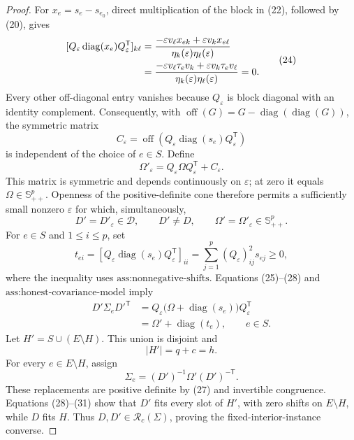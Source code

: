 \documentclass{article}
\begin{document}
\begin{proof}
For \(x_e=s_e-s_{e_0}\), direct multiplication of the block in (22), followed by (20), gives
\[
 \begin{aligned}
 \relax[Q_\varepsilon\operatorname{diag}(x_e)Q_\varepsilon^{\mathsf T}]_{k\ell}
 &=\frac{-\varepsilon v_\ell x_{ek}+\varepsilon v_kx_{e\ell}}
 {\eta_k(\varepsilon)\eta_\ell(\varepsilon)}\\
 &=\frac{-\varepsilon v_\ell\tau_ev_k+\varepsilon v_k\tau_ev_\ell}
 {\eta_k(\varepsilon)\eta_\ell(\varepsilon)}=0.
 \end{aligned}
 \tag{24}
\]
Every other off-diagonal entry vanishes because \(Q_\varepsilon\) is block diagonal with an identity complement.  Consequently, with \(\operatorname{off}(G)=G-\operatorname{diag}(\operatorname{diag}(G))\), the symmetric matrix
\[
 C_\varepsilon
 =\operatorname{off}\!\left(Q_\varepsilon
 \operatorname{diag}(s_e)Q_\varepsilon^{\mathsf T}\right)
 \tag{25}
\]
is independent of the choice of \(e\in S\).  Define
\[
 \Omega'_\varepsilon
 =Q_\varepsilon\Omega Q_\varepsilon^{\mathsf T}+C_\varepsilon.
 \tag{26}
\]
This matrix is symmetric and depends continuously on \(\varepsilon\); at zero it equals \(\Omega\in\mathbb S_{++}^p\).  Openness of the positive-definite cone therefore permits a sufficiently small nonzero \(\varepsilon\) for which, simultaneously,
\[
 D'=D'_{\varepsilon}\in\mathcal D,
 \qquad D'\ne D,
 \qquad \Omega'=\Omega'_\varepsilon\in\mathbb S_{++}^p.
 \tag{27}
\]
For \(e\in S\) and \(1\le i\le p\), set
\[
 t_{ei}
 =[Q_\varepsilon\operatorname{diag}(s_e)Q_\varepsilon^{\mathsf T}]_{ii}
 =\sum_{j=1}^p(Q_\varepsilon)_{ij}^2s_{ej}\ge0,
 \tag{28}
\]
where the inequality uses \(\text{ass:nonnegative-shifts}\).  Equations (25)--(28) and \(\text{ass:honest-covariance-model}\) imply
\[
 \begin{aligned}
 D'\Sigma_eD'^{\mathsf T}
 &=Q_\varepsilon\bigl(\Omega+\operatorname{diag}(s_e)\bigr)Q_\varepsilon^{\mathsf T}\\
 &=\Omega'+\operatorname{diag}(t_e),
 \qquad e\in S.
 \end{aligned}
 \tag{29}
\]
Let \(H'=S\cup(E\setminus H)\).  This union is disjoint and
\[
 |H'|=q+c=h.
 \tag{30}
\]
For every \(e\in E\setminus H\), assign
\[
 \Sigma_e=(D')^{-1}\Omega'(D')^{-\mathsf T}.
 \tag{31}
\]
These replacements are positive definite by (27) and invertible congruence.  Equations (28)--(31) show that \(D'\) fits every slot of \(H'\), with zero shifts on \(E\setminus H\), while \(D\) fits \(H\).  Thus \(D,D'\in\mathcal R_c(\Sigma)\), proving the fixed-interior-instance converse.


\end{proof}
\end{document}
